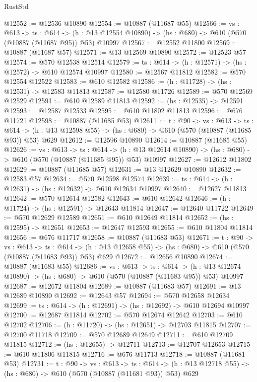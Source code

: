 \begin{lexlean}{RustStd}
\begin{coremodule}
@12552 := @12536 @10890
@12554 := @10887 (@11687 @55)
@12566 := {vs : @613} ->
  {ts : @614} ->
  (h : @13 @12554 @10890) -> (hs : @680) -> @610 (@570 (@10887 (@11687 @95)) @53) @10997
@12567 := @12552 @11800
@12569 := @10887 (@11687 @57)
@12571 := @13 @12569 @10890
@12572 := @12523 @57
@12574 := @570 @12538 @12514
@12579 := {ts : @614} -> (h : @12571) -> (hs : @12572) -> @610 @12574 @10997
@12580 := @12567 @11812
@12582 := @570 @12554 @12522
@12583 := @610 @12582
@12586 := (h : @11728) -> (hs : @12531) -> @12583 @11813
@12587 := @12580 @11726
@12589 := @570 @12569 @12529
@12591 := @610 @12589 @11813
@12592 := (hs : @12535) -> @12591
@12593 := @12587 @12533
@12595 := @610 @11802 @11813
@12596 := @676 @11721
@12598 := @10887 (@11685 @53)
@12611 := {t : @90} ->
  {vs : @613} ->
  {ts : @614} -> (h : @13 @12598 @55) -> (hs : @680) -> @610 (@570 (@10887 (@11685 @93)) @53) @629
@12612 := @12596 @10890
@12614 := @10887 (@11685 @55)
@12626 := {vs : @613} ->
  {ts : @614} ->
  (h : @13 @12614 @10890) -> (hs : @680) -> @610 (@570 (@10887 (@11685 @95)) @53) @10997
@12627 := @12612 @11802
@12629 := @10887 (@11685 @57)
@12631 := @13 @12629 @10890
@12632 := @12583 @57
@12634 := @570 @12598 @12574
@12639 := {ts : @614} -> (h : @12631) -> (hs : @12632) -> @610 @12634 @10997
@12640 := @12627 @11813
@12642 := @570 @12614 @12582
@12643 := @610 @12642
@12646 := (h : @11724) -> (hs : @12591) -> @12643 @11814
@12647 := @12640 @11722
@12649 := @570 @12629 @12589
@12651 := @610 @12649 @11814
@12652 := (hs : @12595) -> @12651
@12653 := @12647 @12593
@12655 := @610 @11804 @11814
@12656 := @676 @11717
@12658 := @10887 (@11683 @53)
@12671 := {t : @90} ->
  {vs : @613} ->
  {ts : @614} -> (h : @13 @12658 @55) -> (hs : @680) -> @610 (@570 (@10887 (@11683 @93)) @53) @629
@12672 := @12656 @10890
@12674 := @10887 (@11683 @55)
@12686 := {vs : @613} ->
  {ts : @614} ->
  (h : @13 @12674 @10890) -> (hs : @680) -> @610 (@570 (@10887 (@11683 @95)) @53) @10997
@12687 := @12672 @11804
@12689 := @10887 (@11683 @57)
@12691 := @13 @12689 @10890
@12692 := @12643 @57
@12694 := @570 @12658 @12634
@12699 := {ts : @614} -> (h : @12691) -> (hs : @12692) -> @610 @12694 @10997
@12700 := @12687 @11814
@12702 := @570 @12674 @12642
@12703 := @610 @12702
@12706 := (h : @11720) -> (hs : @12651) -> @12703 @11815
@12707 := @12700 @11718
@12709 := @570 @12689 @12649
@12711 := @610 @12709 @11815
@12712 := (hs : @12655) -> @12711
@12713 := @12707 @12653
@12715 := @610 @11806 @11815
@12716 := @676 @11713
@12718 := @10887 (@11681 @53)
@12731 := {t : @90} ->
  {vs : @613} ->
  {ts : @614} -> (h : @13 @12718 @55) -> (hs : @680) -> @610 (@570 (@10887 (@11681 @93)) @53) @629

\end{coremodule}
\end{lexlean}
